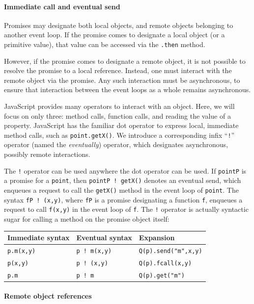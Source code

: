 \documentclass{llncs}
\begin{document}
\paragraph{Immediate call and eventual send}

Promises may designate both local objects, and remote objects belonging to another event loop. If the promise comes to designate a local object (or a primitive value), that value can be accessed via the {\tt .then} method.

However, if the promise comes to designate a remote object, it is not possible to resolve the promise to a local reference. Instead, one must interact with the remote object via the promise. Any such interaction must be asynchronous, to ensure that interaction between the event loops as a whole remains asynchronous.

JavaScript provides many operators to interact with an object. Here, we will focus on only three: method calls, function calls, and reading the value of a property. JavaScript has the familiar dot operator to express local, immediate method calls, such as {\tt point.getX()}. We introduce a corresponding infix ``{\tt !}'' operator (named the \emph{eventually}) operator, which designates asynchronous, possibly remote interactions.

The {\tt !} operator can be used anywhere the dot operator can be used. If {\tt pointP} is a promise for a {\tt point}, then {\tt pointP~!~getX()} denotes an eventual send, which enqueues a request to call the {\tt getX()} method in the event loop of {\tt point}. The syntax {\tt fP~!~(x,y)}, where {\tt fP} is a promise designating a function {\tt f}, enqueues a request to call {\tt f(x,y)} in the event loop of {\tt f}. The {\tt !} operator is actually syntactic sugar for calling a method on the promise object itself:

\begin{center}
  \begin{tabular}{ l | l | l }
  Immediate syntax & Eventual syntax & Expansion \\
  \hline
  {\tt p.m(x,y)} & {\tt p ! m(x,y)} & {\tt Q(p).send("m",x,y)} \\
  {\tt p(x,y)} & {\tt p ! (x,y)} & {\tt Q(p).fcall(x,y)}\\
  {\tt p.m} & {\tt p ! m} & {\tt Q(p).get("m")}\\
  \end{tabular} 
\end{center}


\paragraph{Remote object references}
\end{document}
